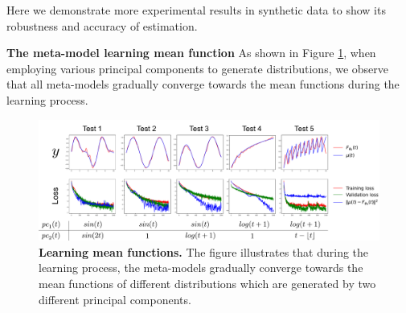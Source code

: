 \documentclass{article}
\begin{document}
Here we demonstrate more experimental results in synthetic data to show its robustness and accuracy of estimation.

\textbf{The meta-model learning mean function} %
As shown in Figure \ref{Learning mean functions}, 
when employing various principal components to generate distributions, 
we observe that all meta-models gradually converge towards the mean functions
during the learning process.\begin{figure}[htb]
  \centering
  \includegraphics[width=\textwidth]{learning_mean_moreExp.pdf}
  \caption{\textbf{Learning mean functions.} The figure illustrates that during the learning process, the meta-models gradually converge towards the mean functions of different distributions which are generated by two different principal components.  }%
  \label{Learning mean functions}
\end{figure}
\end{document}
